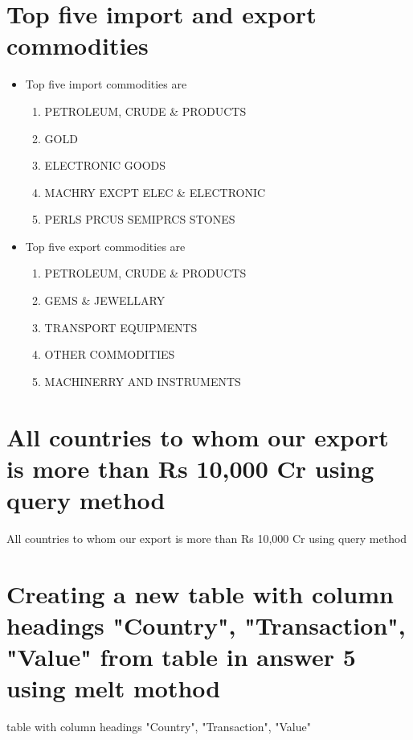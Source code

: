 \documentclass[12pt]{article}
\begin{document}
\section{Top five import and export commodities}
\begin{itemize}
	\item Top five import commodities are
		\begin{enumerate}
			\item PETROLEUM, CRUDE \& PRODUCTS
			\item GOLD
			\item ELECTRONIC GOODS
			\item MACHRY EXCPT ELEC \& ELECTRONIC
			\item PERLS PRCUS SEMIPRCS STONES
		\end{enumerate}


	\item Top five export commodities are
		\begin{enumerate}
			\item PETROLEUM, CRUDE \& PRODUCTS
			\item GEMS \& JEWELLARY
			\item TRANSPORT EQUIPMENTS
			\item OTHER COMMODITIES
			\item MACHINERRY AND INSTRUMENTS
			
		\end{enumerate}
\end{itemize}


\pagebreak
\section{All countries to whom our export is more than Rs 10,000 Cr using query method}
\begin{table}[H]
	\centering
	
	\label{All countries to whom our export is more than Rs 10,000 Cr using query method}
	\caption{All countries to whom our export is more than Rs 10,000 Cr using query method}
\end{table}


\pagebreak
\section{Creating a new table with column headings "Country", "Transaction", "Value" from table in answer 5 using melt mothod}
\begin{table}[H]
	\centering
	
	\label{table with column headings "Country", "Transaction", "Value"}
	\caption{table with column headings "Country", "Transaction", "Value"}
\end{table}
\end{document}
